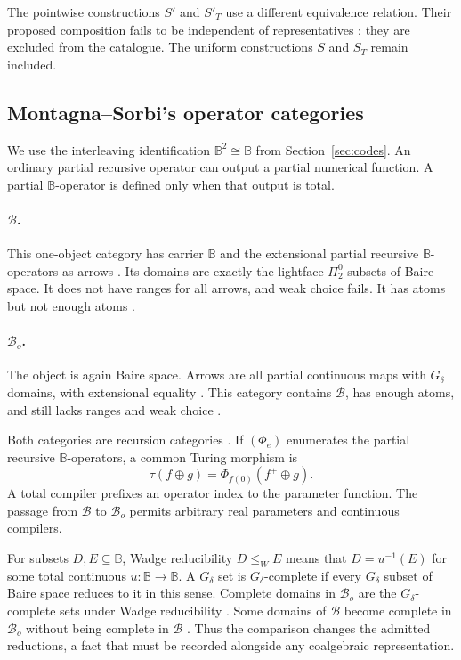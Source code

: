 \documentclass[11pt]{article}
\theoremstyle{definition}
\newcommand{\Baire}{\mathbb B}
\begin{document}
The pointwise constructions $S'$ and $S'_T$ use a different equivalence
relation. Their proposed composition fails to be independent of
representatives \cite{Pointwise}; they are excluded from the catalogue.
The uniform constructions $S$ and $S_T$ remain included.

\subsection{Montagna--Sorbi's operator categories}

We use the interleaving identification $\Baire^2\cong\Baire$
from Section~\ref{sec:codes}.
An ordinary partial recursive operator can output a partial numerical
function. A partial $\Baire$-operator is defined only when that
output is total.

\paragraph{$\mathcal B$.}
This one-object category has carrier $\Baire$ and the extensional
partial recursive $\Baire$-operators as arrows
\cite[Definition 2.1, p.~1027]{MS}. Its domains are exactly the
lightface $\Pi^0_2$ subsets of Baire space. It does not have ranges for
all arrows, and weak choice fails. It has atoms but not enough atoms
\cite[Propositions 2.1--2.3 and Lemma 2.2, pp.~1027--1030]{MS}.

\paragraph{$\mathcal B_o$.}
The object is again Baire space. Arrows are all partial continuous maps
with $G_\delta$ domains, with extensional equality
\cite[Lemma 2.5 and Definition 2.2, pp.~1030--1031]{MS}.
This category contains $\mathcal B$, has enough atoms, and still lacks
ranges and weak choice \cite[Proposition 2.4]{MS}.

Both categories are recursion categories
\cite[Proposition 3.1, p.~1032]{MS}. If $(\Phi_e)$ enumerates the
partial recursive $\Baire$-operators,
a common Turing morphism is
\[
 \tau(f\oplus g)=\Phi_{f(0)}(f^+\oplus g).
\]
A total compiler prefixes an operator index to the parameter function.
The passage from $\mathcal B$ to $\mathcal B_o$ permits arbitrary
real parameters and continuous compilers.

For subsets $D,E\subseteq\Baire$, Wadge reducibility
$D\leq_W E$ means that $D=u^{-1}(E)$ for some total continuous
$u:\Baire\to\Baire$. A $G_\delta$ set is $G_\delta$-complete
if every $G_\delta$ subset of Baire space reduces to it in this sense.
Complete domains in $\mathcal B_o$ are the $G_\delta$-complete sets
under Wadge reducibility \cite[Remark 3.1, p.~1034]{MS}.
Some domains of $\mathcal B$ become complete in $\mathcal B_o$
without being complete in $\mathcal B$
\cite[Corollary 3.4, pp.~1034--1035]{MS}. Thus the comparison changes
the admitted reductions, a fact that must be recorded alongside any
coalgebraic representation.
\end{document}
